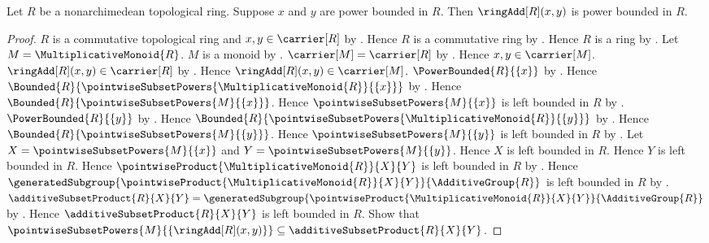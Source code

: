 \begin{theorem}\label{power_bounded_element_addition}
    Let $R$ be a nonarchimedean topological ring.
    Suppose $x$ and $y$ are power bounded in $R$.
    Then $\ringAdd[R](x,y)$ is power bounded in $R$.
\end{theorem}
\begin{proof}
    $R$ is a commutative topological ring and $x,y\in\carrier[R]$ by
        .
    Hence $R$ is a commutative ring by
        .
    Hence $R$ is a ring by .
    Let $M=\MultiplicativeMonoid{R}$.
    $M$ is a monoid by .
    $\carrier[M]=\carrier[R]$ by .
    Hence $x,y\in\carrier[M]$.
    $\ringAdd[R](x,y)\in\carrier[R]$ by .
    Hence $\ringAdd[R](x,y)\in\carrier[M]$.
    $\PowerBounded{R}{\{x\}}$ by .
    Hence $\Bounded{R}{\pointwiseSubsetPowers{
        \MultiplicativeMonoid{R}}{\{x\}}}$ by
        .
    Hence $\Bounded{R}{\pointwiseSubsetPowers{M}{\{x\}}}$.
    Hence $\pointwiseSubsetPowers{M}{\{x\}}$ is left bounded in $R$ by
        .
    $\PowerBounded{R}{\{y\}}$ by .
    Hence $\Bounded{R}{\pointwiseSubsetPowers{
        \MultiplicativeMonoid{R}}{\{y\}}}$ by
        .
    Hence $\Bounded{R}{\pointwiseSubsetPowers{M}{\{y\}}}$.
    Hence $\pointwiseSubsetPowers{M}{\{y\}}$ is left bounded in $R$ by
        .
    Let $X=\pointwiseSubsetPowers{M}{\{x\}}$ and
        $Y=\pointwiseSubsetPowers{M}{\{y\}}$.
    Hence $X$ is left bounded in $R$.
    Hence $Y$ is left bounded in $R$.
    Hence $\pointwiseProduct{\MultiplicativeMonoid{R}}{X}{Y}$ is left
        bounded in $R$ by .
    Hence $\generatedSubgroup{
        \pointwiseProduct{\MultiplicativeMonoid{R}}{X}{Y}}{
        \AdditiveGroup{R}}$ is left bounded in $R$ by
        .
    $\additiveSubsetProduct{R}{X}{Y}
        =\generatedSubgroup{
            \pointwiseProduct{\MultiplicativeMonoid{R}}{X}{Y}}{
            \AdditiveGroup{R}}$ by .
    Hence $\additiveSubsetProduct{R}{X}{Y}$ is left bounded in $R$.
    Show that $\pointwiseSubsetPowers{M}{\{\ringAdd[R](x,y)\}}
        \subseteq\additiveSubsetProduct{R}{X}{Y}$.

\end{proof}
